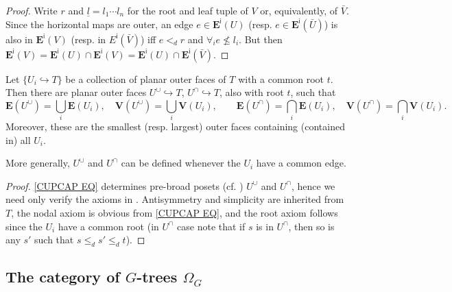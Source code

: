 \documentclass[a4paper,10pt
,draft
]{article}%
\begin{document}
\begin{proof}
	Write $r$ and $\underline{l}=l_1\cdots l_n$
	for the root and leaf tuple of $V$ or, equivalently, of $\bar{V}$.
	Since the horizontal maps are outer, an edge
	$e \in \boldsymbol{E}^{\mathsf{i}}(U)$ 
	(resp. $e \in \boldsymbol{E}^{\mathsf{i}}(\bar{U})$)
	is also in $\boldsymbol{E}^{\mathsf{i}}(V)$ (resp. in $E^{\mathsf{i}}(\bar{V})$) iff
	$e <_d r$ and $\forall_i e \not \leq l_i$.
	But then 
	$\boldsymbol{E}^{\mathsf{i}}(V) =
	\boldsymbol{E}^{\mathsf{i}}(U) \cap 
	\boldsymbol{E}^{\mathsf{i}}(V) =
	\boldsymbol{E}^{\mathsf{i}}(U) \cap
	\boldsymbol{E}^{\mathsf{i}}(\bar{V})$. 
\end{proof}


\begin{lemma}\label{CUPCAP LEM}
	Let $\{U_i \hookrightarrow T\}$ be a collection of planar outer faces of $T$ with a common root $t$. Then there are planar outer faces
	$U^{\cup} \hookrightarrow T$, $U^{\cap} \hookrightarrow T$,
	also with root $t$, such that
\begin{equation}\label{CUPCAP EQ}
	\boldsymbol{E}(U^{\cup}) = \bigcup_i \boldsymbol{E}(U_i), \quad
	\boldsymbol{V}(U^{\cup}) = \bigcup_i \boldsymbol{V}(U_i), \qquad
	\boldsymbol{E}(U^{\cap}) = \bigcap_i \boldsymbol{E}(U_i), \quad
	\boldsymbol{V}(U^{\cap}) = \bigcap_i \boldsymbol{V}(U_i).
\end{equation}
Moreover, these are the smallest (resp. largest) outer faces
containing (contained in) all $U_i$.
\end{lemma}

\begin{remark}
	More generally, $U^{\cup}$ and $U^{\cap}$
	can be defined whenever the $U_i$ have a common edge.
\end{remark}

\begin{proof}
	\eqref{CUPCAP EQ} determines pre-broad posets 
	(cf. \cite[Rem. 5.2]{Per17}) $U^{\cup}$ and $U^{\cap}$,
	hence we need only verify the axioms in 
	\cite[Defs. 5.1, 5.3, 5.9]{Per17}. 
	Antisymmetry and simplicity are inherited from $T$, the nodal axiom is obvious from \eqref{CUPCAP EQ}, and the root axiom follows since the $U_i$ have a common root (in $U^{\cap}$ case note that if $s$ is in $U^{\cap}$, then so is any $s'$ such that
	$s \leq_d s' \leq_d t$).
\end{proof}


\subsection{The category of $G$-trees $\Omega_G$}
\end{document}
